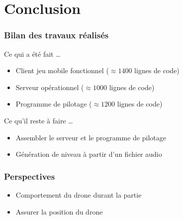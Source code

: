 \section{Conclusion}
\begin{frame}
\frametitle{Bilan des travaux réalisés}
Ce qui a été fait \dots
\begin{itemize}
\item Client jeu mobile fonctionnel ($\approx 1400$ lignes de code)
\item Serveur opérationnel ($\approx 1000$ lignes de code)
\item Programme de pilotage ($\approx 1200$ lignes de code)
\end{itemize}
Ce qu'il reste à faire \dots
\begin{itemize}
\item Assembler le serveur et le programme de pilotage
\item Génération de niveau à partir d'un fichier audio
\end{itemize}
\end{frame}

\begin{frame}
\frametitle{Perspectives}
\begin{center}
\begin{itemize}
\item Comportement du drone durant la partie
\item Assurer la position du drone 
\end{itemize}
\end{center}
\end{frame}